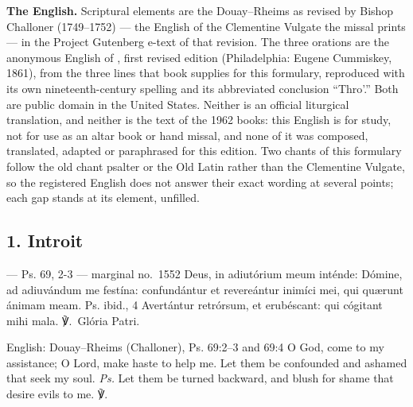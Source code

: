 \textbf{The English.} Scriptural elements are the Douay--Rheims as revised by
Bishop Challoner (1749--1752) --- the English of the Clementine Vulgate the
missal prints --- in the Project Gutenberg e-text of that revision. The three
orations are the anonymous English of , first revised edition
(Philadelphia: Eugene Cummiskey, 1861), from the three lines that book
supplies for this formulary, reproduced with its own nineteenth-century
spelling and its abbreviated conclusion ``Thro'.'' Both are public domain in
the United States. Neither is an official liturgical translation, and neither
is the text of the 1962 books: this English is for study, not for use as an
altar book or hand missal, and none of it was composed, translated, adapted or paraphrased
for this edition. Two chants of this
formulary follow the old chant psalter or the Old Latin rather than the
Clementine Vulgate, so the registered English does not answer their exact
wording at several points; each gap stands at its element, unfilled.

\elementguard
\subsection*{1. Introit }

\begin{appointedlatin}{ --- Ps. 69, 2-3 --- marginal no.\ 1552}
Deus, in adiutórium meum inténde: Dómine, ad adiuvándum me festína:
confundántur et revereántur inimíci mei, qui quærunt ánimam meam.
\textnormal{Ps. ibid., 4} Avertántur retrórsum, et erubéscant: qui cógitant
mihi mala. ℣.~Glória Patri.
\end{appointedlatin}

\begin{namedtranslation}{English: Douay--Rheims (Challoner), Ps. 69:2--3 and 69:4}
O God, come to my assistance; O Lord, make haste to help me. Let them be
confounded and ashamed that seek my soul. \textit{Ps.} Let them be turned
backward, and blush for shame that desire evils to me.
℣.~
\end{namedtranslation}


